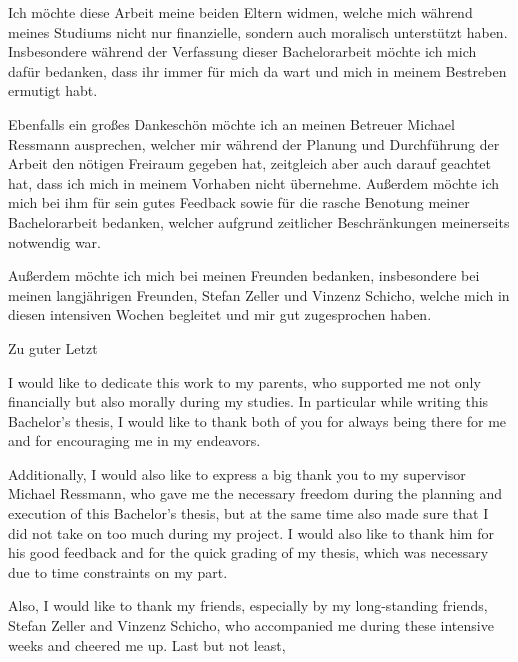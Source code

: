 \documentclass[draft,final]{vutinfth} %
\begin{document}
    \frontmatter %

    \addstatementpage

    \begin{danksagung*}

        Ich möchte diese Arbeit meine beiden Eltern widmen, welche mich während meines Studiums nicht nur finanzielle, sondern auch moralisch unterstützt haben.
        Insbesondere während der Verfassung dieser Bachelorarbeit möchte ich mich dafür bedanken, dass ihr immer für mich da wart und mich in meinem Bestreben ermutigt habt.

        Ebenfalls ein großes Dankeschön möchte ich an meinen Betreuer Michael Ressmann ausprechen, welcher mir während der Planung und Durchführung der Arbeit den nötigen Freiraum gegeben hat, zeitgleich aber auch darauf geachtet hat, dass ich mich in meinem Vorhaben nicht übernehme.
        Außerdem möchte ich mich bei ihm für sein gutes Feedback sowie für die rasche Benotung meiner Bachelorarbeit bedanken, welcher aufgrund zeitlicher Beschränkungen meinerseits notwendig war.

        Außerdem möchte ich mich bei meinen Freunden bedanken, insbesondere bei meinen langjährigen Freunden, Stefan Zeller und Vinzenz Schicho, welche mich in diesen intensiven Wochen begleitet und mir gut zugesprochen haben.

        Zu guter Letzt
    \end{danksagung*}

    \begin{acknowledgements*}
        I would like to dedicate this work to my parents, who supported me not only financially but also morally during my studies.
        In particular while writing this Bachelor's thesis, I would like to thank both of you for always being there for me and for encouraging me in my endeavors.

        Additionally, I would also like to express a big thank you to my supervisor Michael Ressmann, who gave me the necessary freedom during the planning and execution of this Bachelor's thesis, but at the same time also made sure that I did not take on too much during my project.
        I would also like to thank him for his good feedback and for the quick grading of my thesis, which was necessary due to time constraints on my part.

        Also, I would like to thank my friends, especially by my long-standing friends, Stefan Zeller and Vinzenz Schicho, who accompanied me during these intensive weeks and cheered me up.
        Last but not least,

    \end{acknowledgements*}
\end{document}
